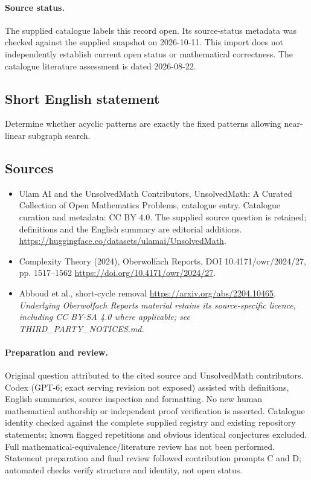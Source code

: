 \documentclass[11pt]{article}
\begin{document}
\paragraph{Source status.}
The supplied catalogue labels this record open. Its source-status metadata was checked against the supplied snapshot on 2026-10-11. This import does not independently establish current open status or mathematical correctness. The catalogue literature assessment is dated 2026-08-22.
\subsection{Short English statement}
Determine whether acyclic patterns are exactly the fixed patterns allowing near-linear subgraph search.
\subsection{Sources}
\begin{itemize}
\item[S1] Ulam AI and the UnsolvedMath Contributors, UnsolvedMath: A Curated Collection of Open Mathematics Problems, catalogue entry. Catalogue curation and metadata: CC BY 4.0. The supplied source question is retained; definitions and the English summary are editorial additions.
\url{https://huggingface.co/datasets/ulamai/UnsolvedMath}.
\item[S2] Complexity Theory (2024), Oberwolfach Reports, DOI 10.4171/owr/2024/27, pp. 1517--1562
\url{https://doi.org/10.4171/owr/2024/27}.
\item[S3] Abboud et al., short-cycle removal
\url{https://arxiv.org/abs/2204.10465}.
\textit{Underlying Oberwolfach Reports material retains its source-specific licence, including CC BY-SA 4.0 where applicable; see THIRD\_PARTY\_NOTICES.md.}
\end{itemize}
\paragraph{Preparation and review.}
Original question attributed to the cited source and UnsolvedMath contributors. Codex (GPT-6; exact serving revision not exposed) assisted with definitions, English summaries, source inspection and formatting. No new human mathematical authorship or independent proof verification is asserted. Catalogue identity checked against the complete supplied registry and existing repository statements; known flagged repetitions and obvious identical conjectures excluded. Full mathematical-equivalence/literature review has not been performed. Statement preparation and final review followed contribution prompts C and D; automated checks verify structure and identity, not open status.
\label{end:statement}
\end{document}
